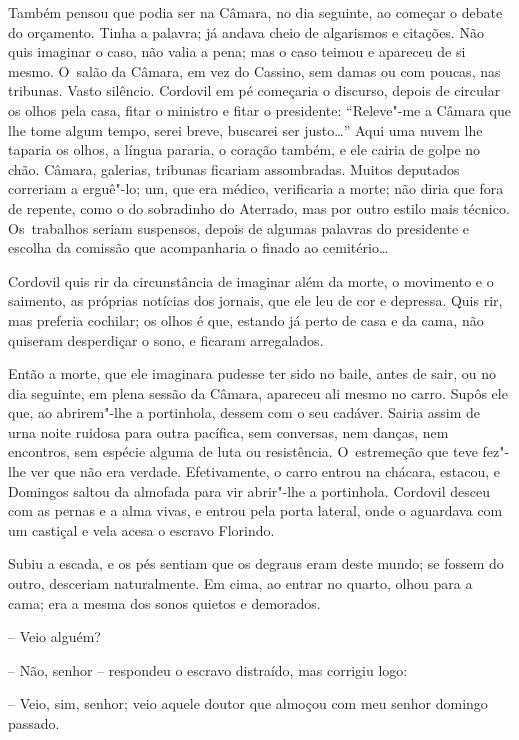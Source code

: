 Também pensou que podia ser na Câmara, no dia seguinte, ao começar o
debate do orçamento. Tinha a palavra; já andava cheio de algarismos e
citações. Não quis imaginar o caso, não valia a pena; mas o caso teimou
e apareceu de si mesmo. O~salão da Câmara, em vez do Cassino, sem damas
ou com poucas, nas tribunas. Vasto silêncio. Cordovil em pé começaria o
discurso, depois de circular os olhos pela casa, fitar o ministro e
fitar o presidente: ``Releve"-me a Câmara que lhe tome algum tempo, serei
breve, buscarei ser justo\ldots{}'' Aqui uma nuvem lhe taparia os olhos, a
língua pararia, o coração também, e ele cairia de golpe no chão. Câmara,
galerias, tribunas ficariam assombradas. Muitos deputados correriam a
erguê"-lo; um, que era médico, verificaria a morte; não diria que fora de
repente, como o do sobradinho do Aterrado, mas por outro estilo mais
técnico. Os~trabalhos seriam suspensos, depois de algumas palavras do
presidente e escolha da comissão que acompanharia o finado ao
cemitério\ldots{}

Cordovil quis rir da circunstância de imaginar além da morte, o
movimento e o saimento, as próprias notícias dos jornais, que ele leu de
cor e depressa. Quis rir, mas preferia cochilar; os olhos é que, estando
já perto de casa e da cama, não quiseram desperdiçar o sono, e ficaram
arregalados.

Então a morte, que ele imaginara pudesse ter sido no baile, antes de
sair, ou no dia seguinte, em plena sessão da Câmara, apareceu ali mesmo
no carro. Supôs ele que, ao abrirem"-lhe a portinhola, dessem com o seu
cadáver. Sairia assim de urna noite ruidosa para outra pacífica, sem
conversas, nem danças, nem encontros, sem espécie alguma de luta ou
resistência. O~estremeção que teve fez"-lhe ver que não era verdade.
Efetivamente, o carro entrou na chácara, estacou, e Domingos saltou da
almofada para vir abrir"-lhe a portinhola. Cordovil desceu com as pernas
e a alma vivas, e entrou pela porta lateral, onde o aguardava com um
castiçal e vela acesa o escravo Florindo.

Subiu a escada, e os pés sentiam que os degraus eram deste mundo; se
fossem do outro, desceriam naturalmente. Em cima, ao entrar no quarto,
olhou para a cama; era a mesma dos sonos quietos e demorados.

-- Veio alguém?

-- Não, senhor -- respondeu o escravo distraído, mas corrigiu logo:

-- Veio, sim, senhor; veio aquele doutor que almoçou com meu senhor
domingo passado.

